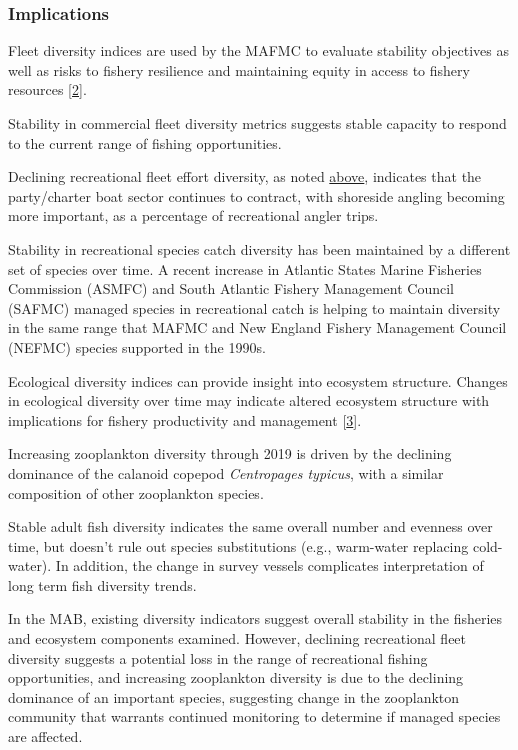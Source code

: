 \documentclass[
  10pt,
]{article}
\begin{document}
\hypertarget{implications-3}{%
\subsubsection{Implications}\label{implications-3}}

Fleet diversity indices are used by the MAFMC to evaluate stability
objectives as well as risks to fishery resilience and maintaining equity
in access to fishery resources
{[}\protect\hyperlink{ref-gaichas_implementing_2018}{2}{]}.

Stability in commercial fleet diversity metrics suggests stable capacity
to respond to the current range of fishing opportunities.

Declining recreational fleet effort diversity, as noted
\protect\hyperlink{recreational-opportunities}{above}, indicates that
the party/charter boat sector continues to contract, with shoreside
angling becoming more important, as a percentage of recreational angler
trips.

Stability in recreational species catch diversity has been maintained by
a different set of species over time. A recent increase in Atlantic
States Marine Fisheries Commission (ASMFC) and South Atlantic Fishery
Management Council (SAFMC) managed species in recreational catch is
helping to maintain diversity in the same range that MAFMC and New
England Fishery Management Council (NEFMC) species supported in the
1990s.

Ecological diversity indices can provide insight into ecosystem
structure. Changes in ecological diversity over time may indicate
altered ecosystem structure with implications for fishery productivity
and management {[}\protect\hyperlink{ref-friedland_changes_2020}{3}{]}.

Increasing zooplankton diversity through 2019 is driven by the declining
dominance of the calanoid copepod \emph{Centropages typicus}, with a
similar composition of other zooplankton species.

Stable adult fish diversity indicates the same overall number and
evenness over time, but doesn't rule out species substitutions (e.g.,
warm-water replacing cold-water). In addition, the change in survey
vessels complicates interpretation of long term fish diversity trends.

In the MAB, existing diversity indicators suggest overall stability in
the fisheries and ecosystem components examined. However, declining
recreational fleet diversity suggests a potential loss in the range of
recreational fishing opportunities, and increasing zooplankton diversity
is due to the declining dominance of an important species, suggesting
change in the zooplankton community that warrants continued monitoring
to determine if managed species are affected.
\end{document}
